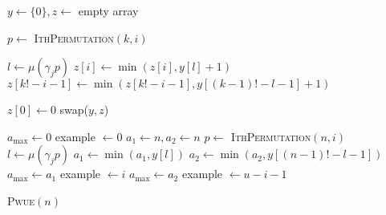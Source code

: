 \documentclass[a4paper, 10pt, ngerman]{article}
\begin{document}
\begin{algorithm}
    $y \gets \{0\}, z \gets$ empty array \;

    {
        {
            $p \gets$ \textsc{IthPermutation}$(k, i)$ \;

             {
                $l \gets \mu(\gamma_j p)$ \;
                $z[i] \gets \min(z[i], y[l] + 1)$ \;
                $z[k! - i - 1] \gets \min(z[k! - i - 1], y[(k-1)! - l - 1] + 1)$ \;
            }
        }

        $z[0] \gets 0$ \;
        swap($y, z$) \;
    }
    $a_{\max} \gets 0$ \; 
    example $\gets 0$ \;
    {
        $a_1 \gets n, a_2 \gets n$ \;
        $p \gets$ \textsc{IthPermutation}$(n, i)$ \;
        {
            $l \gets \mu(\gamma_j p)$ \;
            $a_1 \gets \min(a_1, y[l])$ \;
            $a_2 \gets \min(a_2, y[(n - 1)! - l - 1])$ \;
        }
        {
            $a_{\max} \gets a_1$ \;
            example $\gets i$ \;
        }
        {
            $a_{\max} \gets a_2$ \;
            example $\gets u - i - 1$ \;
        }
    }

     \;

    \caption{\textsc{Pwue}$(n)$}
\end{algorithm}
\end{document}
